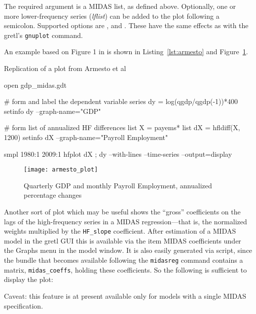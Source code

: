 \documentclass{article}
\begin{document}
The required argument is a MIDAS list, as defined above. Optionally,
one or more lower-frequency series (\textsl{lflist}) can be added to
the plot following a semicolon. Supported options are
,  and . These
have the same effects as with the gretl's \texttt{gnuplot} command.

An example based on Figure 1 in \cite{armesto10} is shown in
Listing~\ref{lst:armesto} and Figure~\ref{fig:armesto}.

\begin{script}[p]
  \caption{Replication of a plot from Armesto et al}
  \label{lst:armesto}
\begin{scode}
open gdp_midas.gdt

# form and label the dependent variable
series dy = log(qgdp/qgdp(-1))*400
setinfo dy --graph-name="GDP"

# form list of annualized HF differences
list X = payems*
list dX = hfldiff(X, 1200)
setinfo dX --graph-name="Payroll Employment"

smpl 1980:1 2009:1
hfplot dX ; dy --with-lines --time-series --output=display
\end{scode}
\end{script}

\begin{figure}[p]
  \centering
  \texttt{[image: armesto\_plot]}
  \caption{Quarterly GDP and monthly Payroll Employment,
  annualized percentage changes}
  \label{fig:armesto}
\end{figure}

Another sort of plot which may be useful shows the ``gross''
coefficients on the lags of the high-frequency series in a MIDAS
regression---that is, the normalized weights multiplied by the
\texttt{HF\_slope} coefficient. After estimation of a MIDAS model in
the gretl GUI this is available via the item \textsf{MIDAS
  coefficients} under the \textsf{Graphs} menu in the model window. It
is also easily generated via script, since the  bundle
that becomes available following the \texttt{midasreg} command
contains a matrix, \texttt{midas\_coeffs}, holding these
coefficients. So the following is sufficient to display the plot:
%

Caveat: this feature is at present available only for models with a
single MIDAS specification.
\end{document}
